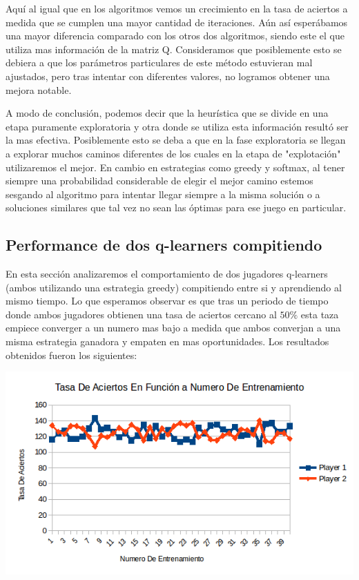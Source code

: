 Aquí al igual que en los algoritmos vemos un crecimiento en la tasa de aciertos a medida que se cumplen una mayor cantidad de iteraciones. Aún así esperábamos una mayor diferencia comparado con los otros dos algoritmos, siendo este el que utiliza mas información de la matriz Q. Consideramos que posiblemente esto se debiera a que los parámetros particulares de este método estuvieran mal ajustados, pero tras intentar con diferentes valores, no logramos obtener una mejora notable.

A modo de conclusión, podemos decir que la heurística que se divide en una etapa puramente exploratoria y otra donde se utiliza esta información resultó ser la mas efectiva. Posiblemente esto se deba a que en la fase exploratoria se llegan a explorar muchos caminos diferentes de los cuales en la etapa de "explotación" utilizaremos el mejor. En cambio en estrategias como greedy y softmax, al tener siempre una probabilidad considerable de elegir el mejor camino estemos sesgando al algoritmo para intentar llegar siempre a la misma solución o a soluciones similares que tal vez no sean las óptimas para ese juego en particular.

\subsection{Performance de dos q-learners compitiendo}

En esta sección analizaremos el comportamiento de dos jugadores q-learners (ambos utilizando una estrategia greedy) compitiendo entre si y aprendiendo al mismo tiempo. Lo que esperamos observar es que tras un periodo de tiempo donde ambos jugadores obtienen una tasa de aciertos cercano al $50 \%$ esta taza empiece converger a un numero mas bajo a medida que ambos converjan a una misma estrategia ganadora y empaten en mas oportunidades. Los resultados obtenidos fueron los siguientes:

\includegraphics[scale=0.5]{testing/qvsq.png}

